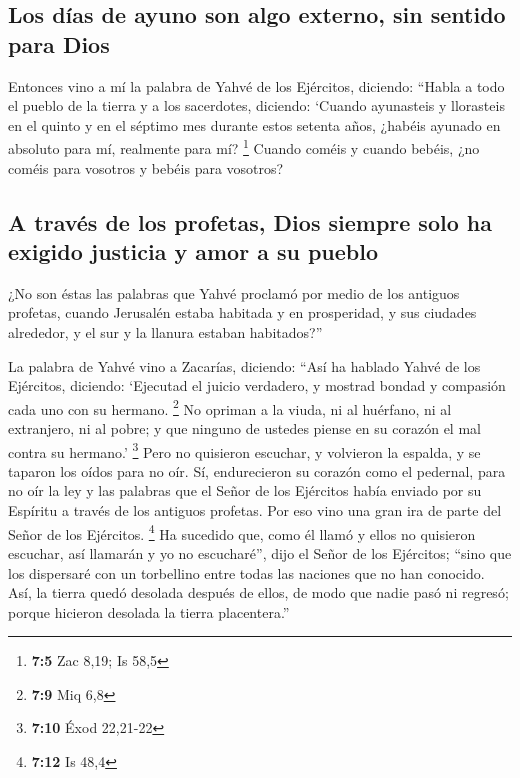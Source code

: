 \begin{paracol}{2}
\hypertarget{los-duxedas-de-ayuno-son-algo-externo-sin-sentido-para-dios}{%
\subsection{Los días de ayuno son algo externo, sin sentido para
Dios}\label{los-duxedas-de-ayuno-son-algo-externo-sin-sentido-para-dios}}

 Entonces vino a mí la palabra de Yahvé de los Ejércitos,
diciendo:  ``Habla a todo el pueblo de la tierra y a los
sacerdotes, diciendo: `Cuando ayunasteis y llorasteis en el quinto y en
el séptimo mes durante estos setenta años, ¿habéis ayunado en absoluto
para mí, realmente para mí? \footnote{\textbf{7:5} Zac 8,19; Is 58,5}
 Cuando coméis y cuando bebéis, ¿no coméis para vosotros y
bebéis para vosotros?

\hypertarget{a-travuxe9s-de-los-profetas-dios-siempre-solo-ha-exigido-justicia-y-amor-a-su-pueblo}{%
\subsection{A través de los profetas, Dios siempre solo ha exigido
justicia y amor a su
pueblo}\label{a-travuxe9s-de-los-profetas-dios-siempre-solo-ha-exigido-justicia-y-amor-a-su-pueblo}}

 ¿No son éstas las palabras que Yahvé proclamó por medio
de los antiguos profetas, cuando Jerusalén estaba habitada y en
prosperidad, y sus ciudades alrededor, y el sur y la llanura estaban
habitados?''

 La palabra de Yahvé vino a Zacarías, diciendo:
 ``Así ha hablado Yahvé de los Ejércitos, diciendo:
`Ejecutad el juicio verdadero, y mostrad bondad y compasión cada uno con
su hermano. \footnote{\textbf{7:9} Miq 6,8}  No opriman a
la viuda, ni al huérfano, ni al extranjero, ni al pobre; y que ninguno
de ustedes piense en su corazón el mal contra su hermano.' \footnote{\textbf{7:10}
  Éxod 22,21-22}  Pero no quisieron escuchar, y volvieron
la espalda, y se taparon los oídos para no oír.  Sí,
endurecieron su corazón como el pedernal, para no oír la ley y las
palabras que el Señor de los Ejércitos había enviado por su Espíritu a
través de los antiguos profetas. Por eso vino una gran ira de parte del
Señor de los Ejércitos. \footnote{\textbf{7:12} Is 48,4} 
Ha sucedido que, como él llamó y ellos no quisieron escuchar, así
llamarán y yo no escucharé'', dijo el Señor de los Ejércitos;
 ``sino que los dispersaré con un torbellino entre todas
las naciones que no han conocido. Así, la tierra quedó desolada después
de ellos, de modo que nadie pasó ni regresó; porque hicieron desolada la
tierra placentera.''


\end{paracol}
